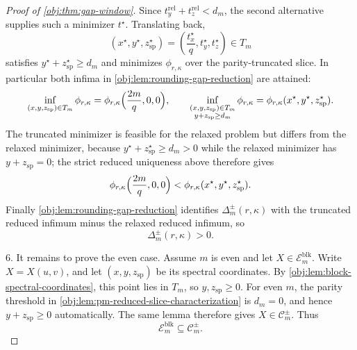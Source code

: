 \documentclass[11pt]{article}
\begin{document}
\begin{proof}[Proof of \cref{obj:thm:gap-window}]
Since \(t^{\mathrm{rel}}_y+t^{\mathrm{rel}}_z<d_m\), the second alternative supplies such a minimizer \(t^\star\). Translating back,
\[
(x^\star,y^\star,z^\star_{\mathrm{sp}})
=
\left(\frac{t_x^\star}{q},t_y^\star,t_z^\star\right)
\in T_m
\]
satisfies \(y^\star+z^\star_{\mathrm{sp}}\ge d_m\) and minimizes \(\phi_{r,\kappa}\) over the parity-truncated slice.  In particular both infima in \cref{obj:lem:rounding-gap-reduction} are attained:
\[
\inf_{(x,y,z_{\mathrm{sp}})\in T_m}\phi_{r,\kappa}
=\phi_{r,\kappa}\Bigl(\frac{2m}{q},0,0\Bigr),
\qquad
\inf_{\substack{(x,y,z_{\mathrm{sp}})\in T_m\\ y+z_{\mathrm{sp}}\ge d_m}}\phi_{r,\kappa}
=\phi_{r,\kappa}(x^\star,y^\star,z^\star_{\mathrm{sp}}).
\]
The truncated minimizer is feasible for the relaxed problem but differs from the relaxed minimizer, because \(y^\star+z^\star_{\mathrm{sp}}\ge d_m>0\) while the relaxed minimizer has \(y+z_{\mathrm{sp}}=0\); the strict reduced uniqueness above therefore gives
\[
\phi_{r,\kappa}\Bigl(\frac{2m}{q},0,0\Bigr)<\phi_{r,\kappa}(x^\star,y^\star,z^\star_{\mathrm{sp}}).
\]
Finally \cref{obj:lem:rounding-gap-reduction} identifies \(\Delta_m^{\pm}(r,\kappa)\) with the truncated reduced infimum minus the relaxed reduced infimum, so
\[
\Delta_m^{\pm}(r,\kappa)>0.
\]  %

6.  It remains to prove the even case. Assume \(m\) is even and let \(X\in\mathcal E_m^{\mathrm{blk}}\). Write \(X=X(u,v)\), and let \((x,y,z_{\mathrm{sp}})\) be its spectral coordinates. By \cref{obj:lem:block-spectral-coordinates}, this point lies in \(T_m\), so \(y,z_{\mathrm{sp}}\ge0\). For even \(m\), the parity threshold in \cref{obj:lem:pm-reduced-slice-characterization} is \(d_m=0\), and hence \(y+z_{\mathrm{sp}}\ge0\) automatically. The same lemma therefore gives \(X\in\mathcal C_m^{\pm}\). Thus
\[
\mathcal E_m^{\mathrm{blk}}\subseteq\mathcal C_m^{\pm}.
\]  %
\end{proof}
\end{document}
